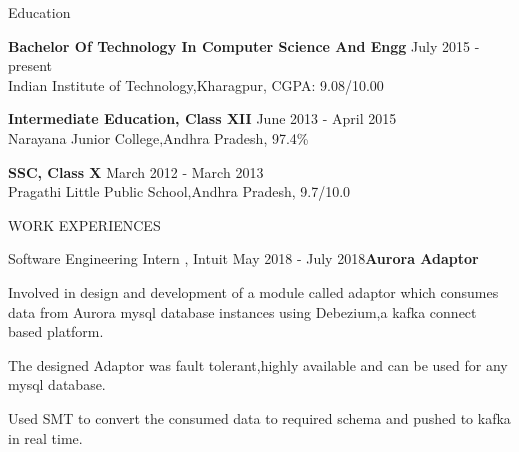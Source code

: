 \documentclass{resume} %
\begin{document}
  


\begin{rSection}{Education}

{\bf Bachelor Of Technology In Computer Science And Engg} \hfill {July 2015 - present}
\\ 
Indian Institute of Technology,Kharagpur, CGPA: 9.08/10.00   

{\bf Intermediate Education, Class XII} \hfill {June 2013 - April 2015}
\\ 
Narayana Junior College,Andhra Pradesh, 97.4\%

{\textbf{SSC, Class X}}  \hfill{March 2012 - March 2013}\\
Pragathi Little Public School,Andhra Pradesh, 9.7/10.0    


\end{rSection} 

  
\begin{rSection}{WORK EXPERIENCES}

\begin{rSubsection}{Software Engineering Intern , Intuit }{May 2018 - July 2018}{\textbf{Aurora Adaptor}}{}              
\item Involved in design and development of a module called adaptor which consumes data from Aurora mysql database instances using
Debezium,a kafka connect based platform.
\item The designed Adaptor was fault tolerant,highly available and can be used for any mysql database. 
\item Used SMT to convert  the consumed data to required schema and pushed to kafka in real time.
\end{rSubsection}  

\end{rSection}
\end{document}
